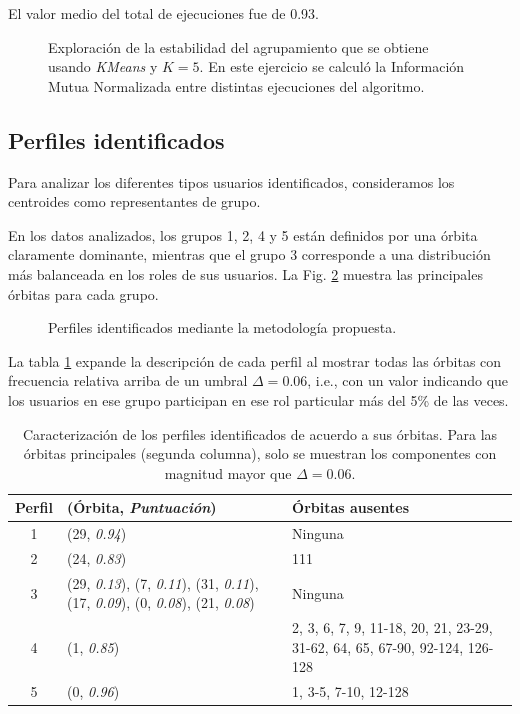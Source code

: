 El valor medio del total de ejecuciones fue de 0.93. 

\begin{figure}[htbp]
   \centering
   
    \caption{Exploración de la estabilidad del agrupamiento que se obtiene usando \textit{KMeans} y $K=5$. En este ejercicio se calculó la Información Mutua Normalizada entre distintas ejecuciones del algoritmo.}
    \label{fig:estability-NMI}
\end{figure}

\subsection{Perfiles identificados}
Para analizar los diferentes tipos usuarios identificados, consideramos los centroides como representantes de grupo. 

En los datos analizados, los grupos 1, 2, 4 y 5 están definidos por una órbita claramente dominante, mientras que el grupo 3 corresponde a una distribución más balanceada en los roles de sus usuarios. La Fig. \ref{fig:perfiles} muestra las principales órbitas para cada grupo. 

\begin{figure}[htbp]
   \centering
   
    \caption{Perfiles identificados mediante la metodología propuesta. }
    \label{fig:perfiles}
\end{figure}

La tabla \ref{table:orbitsgroups} expande la descripción de cada perfil al mostrar todas las órbitas con frecuencia relativa arriba de un umbral $\Delta = 0.06$, i.e., con un valor indicando que los usuarios en ese grupo participan en ese rol particular más del 5\% de las veces. 
\begin{table}[]    
    \centering
    \caption{Caracterización de los perfiles identificados de acuerdo a sus órbitas. Para las órbitas principales (segunda columna), solo se muestran los componentes con magnitud mayor que $\Delta=0.06$.}
    \begin{tabular}{cp{}p{}}
         \hline
         \textbf{Perfil}\phantom{xx} & \textbf{(Órbita, \textit{Puntuación})}&\textbf{Órbitas ausentes}\\\hline \hline
         1& (29, \textit{0.94}) & Ninguna \\ \hline
         2&(24, \textit{0.83}) & 111 \\ \hline
         3&(29, \textit{0.13}), (7, \textit{0.11}), \newline(31, \textit{0.11}), (17, \textit{0.09}), \newline(0, \textit{0.08}), (21, \textit{0.08}) & Ninguna \\\hline
         4& (1, \textit{0.85}) & 2, 3, 6, 7, 9, 11-18, 20, 21, 23-29, 31-62, 64, 65, 67-90, 92-124, 126-128\\ \hline
         5&(0, \textit{0.96})&1, 3-5, 7-10, 12-128\\ \hline
    \end{tabular}
    \label{table:orbitsgroups}
\end{table}

